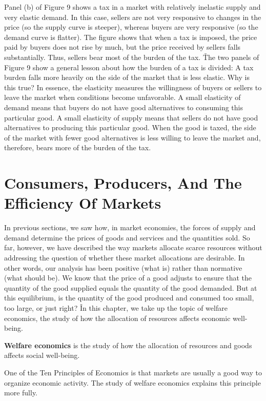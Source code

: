 Panel (b) of Figure 9 shows a tax in a market with relatively inelastic supply and very elastic demand. In this case,
sellers are not very responsive to changes in the price (so the supply curve is steeper), whereas buyers are very
responsive (so the demand curve is flatter). The figure shows that when a tax is imposed, the price paid by buyers
does not rise by much, but the price received by sellers falls substantially. Thus, sellers bear most of the burden
of the tax. \v

The two panels of Figure 9 show a general lesson about how the burden of a tax is divided: A tax burden falls more
heavily on the side of the market that is less elastic. Why is this true? In essence, the elasticity measures the
willingness of buyers or sellers to leave the market when conditions become unfavorable. A small elasticity of demand
means that buyers do not have good alternatives to consuming this particular good. A small elasticity of supply means
that sellers do not have good alternatives to producing this particular good. When the good is taxed, the side of the
market with fewer good alternatives is less willing to leave the market and, therefore, bears more of the burden of
the tax.

\section{Consumers, Producers, And The Efficiency Of Markets}

In previous sections, we saw how, in market economies, the forces of supply and demand determine the prices of goods
and services and the quantities sold. So far, however, we have described the way markets allocate scarce resources
without addressing the question of whether these market allocations are desirable. In other words, our analysis has
been positive (what is) rather than normative (what should be). We know that the price of a good adjusts to ensure
that the quantity of the good supplied equals the quantity of the good demanded. But at this equilibrium, is the
quantity of the good produced and consumed too small, too large, or just right? \v

In this chapter, we take up the topic of welfare economics, the study of how the allocation of resources affects
economic well-being.

\textbf{Welfare economics} is the study of how the allocation of resources and goods affects social well-being.
\ed

One of the Ten Principles of Economics is that markets are usually a good way to organize economic activity. The
study of welfare economics explains this principle more fully.

